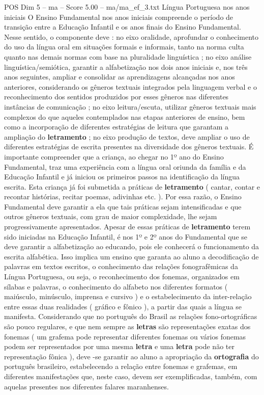 \begin{textsample}{POS Dim 5 – ma – Score 5.00 – ma/ma\_ef\_3.txt}  \label{ex:f5_pos_174}
Língua Portuguesa nos anos iniciais O Ensino Fundamental nos anos iniciais compreende o período de transição entre a Educação Infantil e os anos finais do Ensino Fundamental.
Nesse sentido, o componente deve : no eixo oralidade, aprofundar o conhecimento do uso da língua oral em situações formais e informais, tanto na norma culta quanto nas demais normas com base na pluralidade linguística ; no eixo análise linguística/semiótica, garantir a alfabetização nos dois anos iniciais e, nos três anos seguintes, ampliar e consolidar as aprendizagens alcançadas nos anos anteriores, considerando os gêneros textuais integrados pela linguagem verbal e o reconhecimento dos sentidos produzidos por esses gêneros nas diferentes instâncias de comunicação ; no eixo leitura/escuta, utilizar gêneros textuais mais complexos do que aqueles contemplados nas etapas anteriores de ensino, bem como a incorporação de diferentes estratégias de leitura que garantam a ampliação do \textbf{letramento} ; no eixo produção de textos, deve ampliar o uso de diferentes estratégias de escrita presentes na diversidade dos gêneros textuais.
É importante compreender que a criança, ao chegar no 1º ano do Ensino Fundamental, traz uma experiência com a língua oral oriunda da família e da Educação Infantil e já iniciou os primeiros passos na identificação da língua escrita.
Esta criança já foi submetida a práticas de \textbf{letramento} ( cantar, contar e recontar histórias, recitar poemas, adivinhas etc. ).
Por essa razão, o Ensino Fundamental deve garantir a ela que tais práticas sejam intensificadas e que outros gêneros textuais, com grau de maior complexidade, lhe sejam progressivamente apresentados.
Apesar de essas práticas de \textbf{letramento} terem sido iniciadas na Educação Infantil, é nos 1º e 2º anos do Fundamental que se deve garantir a alfabetização ao educando, pois ele conhecerá o funcionamento da escrita alfabética.
Isso implica um ensino que garanta ao aluno a decodificação de palavras em textos escritos, o conhecimento das relações fonografêmicas da Língua Portuguesa, ou seja, o reconhecimento dos fonemas, organizados em sílabas e palavras, o conhecimento do alfabeto nos diferentes formatos ( maiúsculo, minúsculo, imprensa e cursivo ) e o estabelecimento da inter-relação entre essas duas realidades ( gráfico e fônico ), a partir das quais a língua se manifesta.
Considerando que no português do Brasil as relações fono-ortográficas são pouco regulares, e que nem sempre as \textbf{letras} são representações exatas dos fonemas ( um grafema pode representar diferentes fonemas ou vários fonemas podem ser representados por uma mesma \textbf{letra} e uma \textbf{letra} pode não ter representação fônica ), deve -se garantir ao aluno a apropriação da \textbf{ortografia} do português brasileiro, estabelecendo a relação entre fonemas e grafemas, em diferentes manifestações que, neste caso, devem ser exemplificadas, também, com aquelas presentes nos diferentes falares maranhenses.

\end{textsample}
